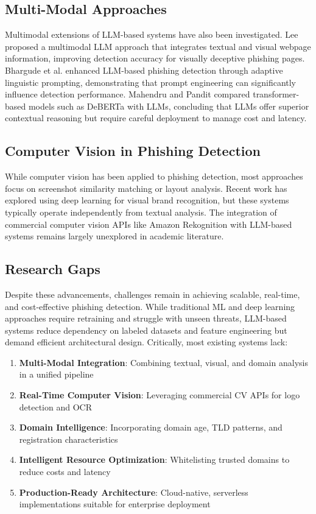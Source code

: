 \documentclass[conference]{IEEEtran}
\begin{document}
\subsection{Multi-Modal Approaches}

Multimodal extensions of LLM-based systems have also been investigated. Lee \cite{lee2024multimodal} proposed a multimodal LLM approach that integrates textual and visual webpage information, improving detection accuracy for visually deceptive phishing pages. Bhargude et al. \cite{bhargude2025adaptive} enhanced LLM-based phishing detection through adaptive linguistic prompting, demonstrating that prompt engineering can significantly influence detection performance. Mahendru and Pandit \cite{mahendru2024securenet} compared transformer-based models such as DeBERTa with LLMs, concluding that LLMs offer superior contextual reasoning but require careful deployment to manage cost and latency.

\subsection{Computer Vision in Phishing Detection}

While computer vision has been applied to phishing detection, most approaches focus on screenshot similarity matching or layout analysis. Recent work has explored using deep learning for visual brand recognition, but these systems typically operate independently from textual analysis. The integration of commercial computer vision APIs like Amazon Rekognition with LLM-based systems remains largely unexplored in academic literature.

\subsection{Research Gaps}

Despite these advancements, challenges remain in achieving scalable, real-time, and cost-effective phishing detection. While traditional ML and deep learning approaches require retraining and struggle with unseen threats, LLM-based systems reduce dependency on labeled datasets and feature engineering but demand efficient architectural design. Critically, most existing systems lack:

\begin{enumerate}
\item \textbf{Multi-Modal Integration}: Combining textual, visual, and domain analysis in a unified pipeline
\item \textbf{Real-Time Computer Vision}: Leveraging commercial CV APIs for logo detection and OCR
\item \textbf{Domain Intelligence}: Incorporating domain age, TLD patterns, and registration characteristics
\item \textbf{Intelligent Resource Optimization}: Whitelisting trusted domains to reduce costs and latency
\item \textbf{Production-Ready Architecture}: Cloud-native, serverless implementations suitable for enterprise deployment
\end{enumerate}
\end{document}
